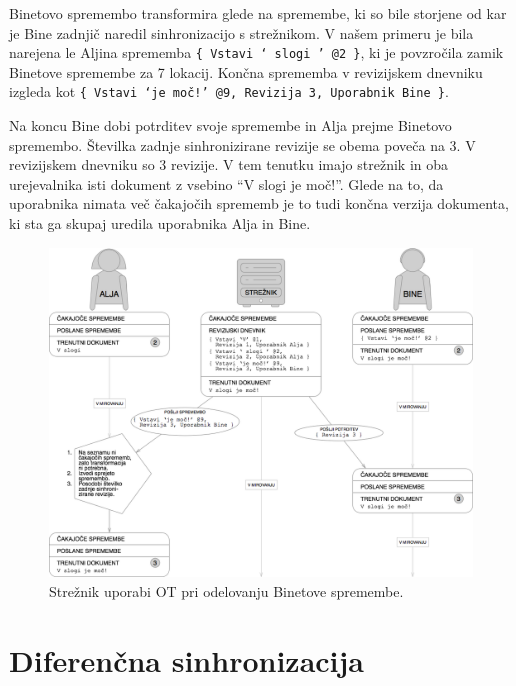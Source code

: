 \documentclass[a4paper, 12pt, twoside]{book}
\begin{document}
Binetovo spremembo transformira glede na spremembe, ki so bile storjene od kar je Bine zadnjič naredil sinhronizacijo s strežnikom. V našem primeru je bila narejena le Aljina sprememba {\tt \{ Vstavi ‘ slogi ’ @2 \}}, ki je povzročila zamik Binetove spremembe za 7 lokacij. Končna sprememba v revizijskem dnevniku izgleda kot {\tt \{ Vstavi ‘je moč!’ @9, Revizija 3, Uporabnik Bine \}}.

\pagebreak

Na koncu Bine dobi potrditev svoje spremembe in Alja prejme Binetovo spremembo. Številka zadnje sinhronizirane revizije se obema poveča na 3. V revizijskem dnevniku so 3 revizije. V tem tenutku imajo strežnik in oba urejevalnika isti dokument z vsebino “V slogi je moč!”. Glede na to, da uporabnika nimata več čakajočih sprememb je to tudi končna verzija dokumenta, ki sta ga skupaj uredila uporabnika Alja in Bine.

\begin{figure}[placement h]
\begin{center}
\includegraphics[width=14cm]{pc6.png}
\end{center}
\caption{Strežnik uporabi OT pri odelovanju Binetove spremembe.}
\label{pc6}
\end{figure}

\section{Diferenčna sinhronizacija}
\end{document}

